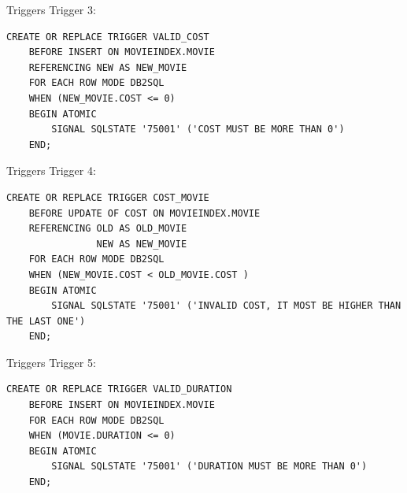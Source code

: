 \documentclass{beamer}%
\begin{document}
\begin{frame}[fragile]{Triggers}
Trigger 3:
\begin{tiny}
\begin{verbatim}
CREATE OR REPLACE TRIGGER VALID_COST
    BEFORE INSERT ON MOVIEINDEX.MOVIE
    REFERENCING NEW AS NEW_MOVIE
    FOR EACH ROW MODE DB2SQL
    WHEN (NEW_MOVIE.COST <= 0)
    BEGIN ATOMIC
        SIGNAL SQLSTATE '75001' ('COST MUST BE MORE THAN 0')
    END;
\end{verbatim}
\end{tiny}
\end{frame}

\begin{frame}[fragile]{Triggers}
Trigger 4:
\begin{tiny}
\begin{verbatim}
CREATE OR REPLACE TRIGGER COST_MOVIE
    BEFORE UPDATE OF COST ON MOVIEINDEX.MOVIE
    REFERENCING OLD AS OLD_MOVIE
                NEW AS NEW_MOVIE
    FOR EACH ROW MODE DB2SQL
    WHEN (NEW_MOVIE.COST < OLD_MOVIE.COST )
    BEGIN ATOMIC
        SIGNAL SQLSTATE '75001' ('INVALID COST, IT MOST BE HIGHER THAN THE LAST ONE')
    END;
\end{verbatim}
\end{tiny}
\end{frame}

\begin{frame}[fragile]{Triggers}
Trigger 5:
\begin{tiny}
\begin{verbatim}
CREATE OR REPLACE TRIGGER VALID_DURATION
    BEFORE INSERT ON MOVIEINDEX.MOVIE
    FOR EACH ROW MODE DB2SQL
    WHEN (MOVIE.DURATION <= 0)
    BEGIN ATOMIC
        SIGNAL SQLSTATE '75001' ('DURATION MUST BE MORE THAN 0')
    END;
\end{verbatim}
\end{tiny}
\end{frame}
\end{document}
